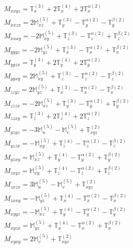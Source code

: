 \documentclass[fleqn,8pt,landscape]{jsarticle}
\begin{document}
\begin{align*}
& M_{xxyz} = \mathbb{T}_{x}^{(3)} + 2 \mathbb{T}_{x}^{(4)} + 2 \mathbb{T}_{x}^{\alpha(2)} \\
& M_{xxzx} = 2 \mathbb{M}_{xz}^{(5)} + \mathbb{T}_{y}^{(3)} - \mathbb{T}_{y}^{\alpha(2)} - \mathbb{T}_{y}^{\beta(2)} \\
& M_{xxxy} = - 2 \mathbb{M}_{xy}^{(5)} + \mathbb{T}_{z}^{(3)} - \mathbb{T}_{z}^{\alpha(2)} + \mathbb{T}_{z}^{\beta(2)} \\
& M_{yyyz} = - 2 \mathbb{M}_{yz}^{(5)} + \mathbb{T}_{x}^{(3)} - \mathbb{T}_{x}^{\alpha(2)} + \mathbb{T}_{x}^{\beta(2)} \\
& M_{yyzx} = \mathbb{T}_{y}^{(3)} + 2 \mathbb{T}_{y}^{(4)} + 2 \mathbb{T}_{y}^{\alpha(2)} \\
& M_{yyxy} = 2 \mathbb{M}_{xy}^{(5)} + \mathbb{T}_{z}^{(3)} - \mathbb{T}_{z}^{\alpha(2)} - \mathbb{T}_{z}^{\beta(2)} \\
& M_{zzyz} = 2 \mathbb{M}_{yz}^{(5)} + \mathbb{T}_{x}^{(3)} - \mathbb{T}_{x}^{\alpha(2)} - \mathbb{T}_{x}^{\beta(2)} \\
& M_{zzzx} = - 2 \mathbb{M}_{xz}^{(5)} + \mathbb{T}_{y}^{(3)} - \mathbb{T}_{y}^{\alpha(2)} + \mathbb{T}_{y}^{\beta(2)} \\
& M_{zzxy} = \mathbb{T}_{z}^{(3)} + 2 \mathbb{T}_{z}^{(4)} + 2 \mathbb{T}_{z}^{\alpha(2)} \\
& M_{yzyz} = - 3 \mathbb{M}_{u}^{(5)} - \mathbb{M}_{v}^{(5)} + \mathbb{T}_{xyz}^{(2)} \\
& M_{yzzx} = - \mathbb{M}_{xy}^{(5)} + \mathbb{T}_{z}^{(4)} - \mathbb{T}_{z}^{\alpha(2)} - \mathbb{T}_{z}^{\beta(2)} \\
& M_{yzxy} = \mathbb{M}_{xz}^{(5)} + \mathbb{T}_{y}^{(4)} - \mathbb{T}_{y}^{\alpha(2)} + \mathbb{T}_{y}^{\beta(2)} \\
& M_{zxyz} = \mathbb{M}_{xy}^{(5)} + \mathbb{T}_{z}^{(4)} - \mathbb{T}_{z}^{\alpha(2)} + \mathbb{T}_{z}^{\beta(2)} \\
& M_{zxzx} = 3 \mathbb{M}_{u}^{(5)} - \mathbb{M}_{v}^{(5)} + \mathbb{T}_{xyz}^{(2)} \\
& M_{zxxy} = - \mathbb{M}_{yz}^{(5)} + \mathbb{T}_{x}^{(4)} - \mathbb{T}_{x}^{\alpha(2)} - \mathbb{T}_{x}^{\beta(2)} \\
& M_{xyyz} = - \mathbb{M}_{xz}^{(5)} + \mathbb{T}_{y}^{(4)} - \mathbb{T}_{y}^{\alpha(2)} - \mathbb{T}_{y}^{\beta(2)} \\
& M_{xyzx} = \mathbb{M}_{yz}^{(5)} + \mathbb{T}_{x}^{(4)} - \mathbb{T}_{x}^{\alpha(2)} + \mathbb{T}_{x}^{\beta(2)} \\
& M_{xyxy} = 2 \mathbb{M}_{v}^{(5)} + \mathbb{T}_{xyz}^{(2)}
\end{align*}
\end{document}
